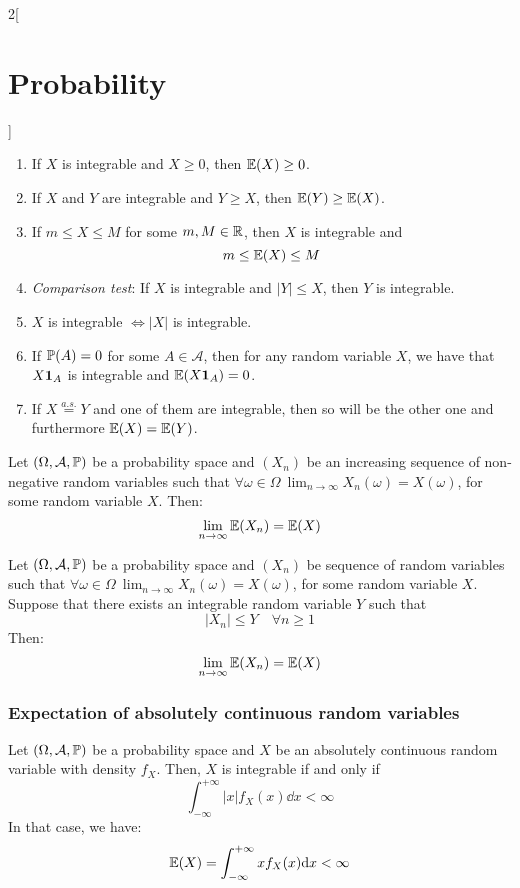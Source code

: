 \documentclass[../../../main.tex]{subfiles}
\begin{document}
\begin{multicols}{2}[\section{Probability}]
\begin{prop}
\begin{enumerate}
      \item If $X$ is integrable and $X\geq 0$, then $\mathbb{E}(X)\geq 0$.
      \item If $X$ and $Y$ are integrable and $Y\geq X$, then $\mathbb{E}(Y)\geq \mathbb{E}(X)$.
      \item If $m\leq X\leq M$ for some $m, M\in\mathbb{R}$, then $X$ is integrable and $$m\leq \mathbb{E}(X)\leq M$$
      \item \textit{Comparison test}: If $X$ is integrable and $|Y|\leq X$, then $Y$ is integrable.
      \item $X$ is integrable $\iff |X|$ is integrable.
      \item If $\mathbb{P}(A)=0$ for some $A\in\mathcal{A}$, then for any random variable $X$, we have that $X\boldsymbol{\mathrm{1}}_A$ is integrable and $\mathbb{E}(X\boldsymbol{\mathrm{1}}_A)=0$.
      \item If $X\overset{a.s.}{=}Y$ and one of them are integrable, then so will be the other one and furthermore $\mathbb{E}(X)=\mathbb{E}(Y)$.
    \end{enumerate}
  \end{prop}
  \begin{theorem}
    Let $(\Omega,\mathcal{A},\mathbb{P})$ be a probability space and $(X_n)$ be an increasing sequence of non-negative random variables such that $\displaystyle\forall\omega\in\Omega\ \lim_{n\to\infty}X_n(\omega)=X(\omega)$, for some random variable $X$. Then: $$\lim_{n\to\infty} \mathbb{E}(X_n)=\mathbb{E}(X)$$
  \end{theorem}
  \begin{theorem}
    Let $(\Omega,\mathcal{A},\mathbb{P})$ be a probability space and $(X_n)$ be sequence of random variables such that $\displaystyle\forall\omega\in\Omega\ \lim_{n\to\infty}X_n(\omega)=X(\omega)$, for some random variable $X$. Suppose that there exists an integrable random variable $Y$ such that $$|X_n|\leq Y\quad\forall n\geq 1$$ Then: $$\lim_{n\to\infty} \mathbb{E}(X_n)=\mathbb{E}(X)$$
  \end{theorem}
  \subsubsection{Expectation of absolutely continuous random variables}
  \begin{theorem}
    Let $(\Omega,\mathcal{A},\mathbb{P})$ be a probability space and $X$ be an absolutely continuous random variable with density $f_X$. Then, $X$ is integrable if and only if $$\int_{-\infty}^{+\infty}|x|f_X(x)\dd x<\infty$$
    In that case, we have: $$\mathbb{E}(X)=\int_{-\infty}^{+\infty}xf_X(x)\dd x<\infty$$
  \end{theorem}

\end{multicols}
\end{document}
